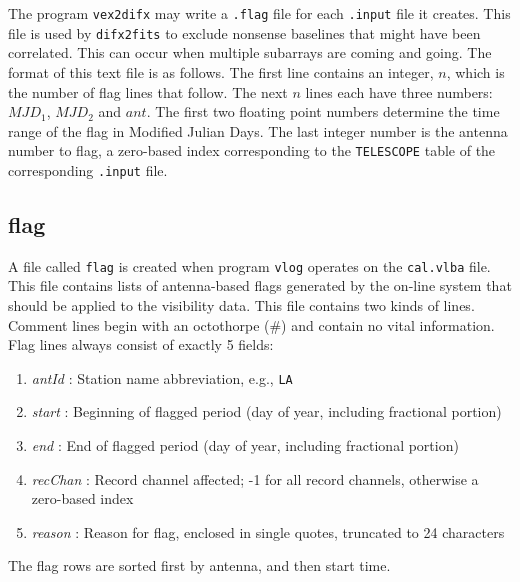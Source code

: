 The program {\tt vex2difx} may write a {\tt .flag} file for each {\tt .input} file it creates.
This file is used by {\tt difx2fits} to exclude nonsense baselines that might have been correlated.
This can occur when multiple subarrays are coming and going.
The format of this text file is as follows.
The first line contains an integer, $n$, which is the number of flag lines that follow.
The next $n$ lines each have three numbers: $MJD_1$, $MJD_2$ and $ant$.
The first two floating point numbers determine the time range of the flag in Modified Julian Days.
The last integer number is the antenna number to flag, a zero-based index corresponding to the {\tt TELESCOPE} table of the corresponding {\tt .input} file.








\subsection{flag} \label{sec:flag}

A file called {\tt flag} is created when program {\tt vlog} operates on the {\tt cal.vlba} file.
This file contains lists of antenna-based flags generated by the on-line system that should be applied to the visibility data.
This file contains two kinds of lines.
Comment lines begin with an octothorpe (\#) and contain no vital information.
Flag lines always consist of exactly 5 fields:
\begin{enumerate}
\item {\em antId} : Station name abbreviation, e.g., {\tt LA}
\item {\em start} : Beginning of flagged period (day of year, including fractional portion)
\item {\em end} : End of flagged period (day of year, including fractional portion)
\item {\em recChan} : Record channel affected; -1 for all record channels, otherwise a zero-based index
\item {\em reason} : Reason for flag, enclosed in single quotes, truncated to 24 characters
\end{enumerate}
The flag rows are sorted first by antenna, and then start time.








